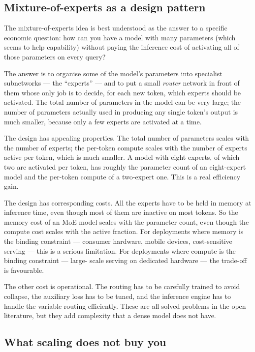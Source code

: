\subsection*{Mixture-of-experts as a design pattern}

The mixture-of-experts idea is best understood as the answer to
a specific economic question: how can you have a model with
many parameters (which seems to help capability) without paying
the inference cost of activating all of those parameters on
every query?

The answer is to organise some of the model's parameters into
specialist subnetworks --- the ``experts'' --- and to put a
small \emph{router} network in front of them whose only job is
to decide, for each new token, which experts should be
activated. The total number of parameters in the model can be
very large; the number of parameters actually used in producing
any single token's output is much smaller, because only a few
experts are activated at a time.

The design has appealing properties. The total number of
parameters scales with the number of experts; the per-token
compute scales with the number of experts active per token,
which is much smaller. A model with eight experts, of which two
are activated per token, has roughly the parameter count of an
eight-expert model and the per-token compute of a two-expert
one. This is a real efficiency gain.

The design has corresponding costs. All the experts have to be
held in memory at inference time, even though most of them are
inactive on most tokens. So the memory cost of an MoE model
scales with the parameter count, even though the compute cost
scales with the active fraction. For deployments where memory
is the binding constraint --- consumer hardware, mobile devices,
cost-sensitive serving --- this is a serious limitation. For
deployments where compute is the binding constraint --- large-
scale serving on dedicated hardware --- the trade-off is
favourable.

The other cost is operational. The routing has to be carefully
trained to avoid collapse, the auxiliary loss has to be tuned,
and the inference engine has to handle the variable routing
efficiently. These are all solved problems in the open
literature, but they add complexity that a dense model does
not have.

\subsection*{What scaling does not buy you}

